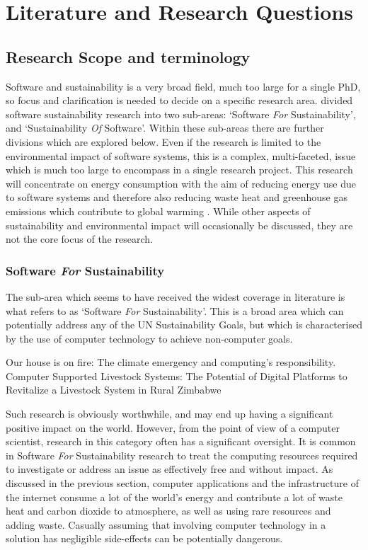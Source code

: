 \chapter{Literature and Research Questions}
\label{chapter:questions}

\section{Research Scope and terminology}
\label{section:literature scope}

Software and sustainability is a very broad field, much too large for a single PhD, so focus and clarification is needed to decide on a specific research area. \citet{Penzenstadler2013} divided software sustainability research into two sub-areas: `Software \emph{For} Sustainability', and `Sustainability \emph{Of} Software'. Within these sub-areas there are further divisions which are explored below. Even if the research is limited to the environmental impact of software systems, this is a complex, multi-faceted, issue which is much too large to encompass in a single research project. This research will concentrate on energy consumption with the aim of reducing energy use due to software systems and therefore also reducing waste heat and greenhouse gas emissions which contribute to global warming . While other aspects of sustainability and environmental impact will occasionally be discussed, they are not the core focus of the research.

\subsection{Software \emph{For} Sustainability}

The sub-area which seems to have received the widest coverage in literature is what  \cite{Penzenstadler2013} refers to as `Software \emph{For} Sustainability'. This is a broad area which can potentially address any of the UN Sustainability Goals, but which is characterised by the use of computer technology to achieve non-computer goals.

\citep{Knowles2022} Our house is on fire: The climate emergency and computing's responsibility.
\citep{Gwaka2022} Computer Supported Livestock Systems: The Potential of Digital Platforms to Revitalize a Livestock System in Rural Zimbabwe

Such research is obviously worthwhile, and may end up having a significant positive impact on the world. However, from the point of view of a computer scientist, research in this category often has a significant oversight. It is common in Software \emph{For} Sustainability research to treat the computing resources required to investigate or address an issue as effectively free and without impact. As discussed in the previous section, computer applications and the infrastructure of the internet consume a lot of the world's energy and contribute a lot of waste heat and carbon dioxide to atmosphere, as well as using rare resources and adding waste. Casually assuming that involving computer technology in a solution has negligible side-effects can be potentially dangerous.

